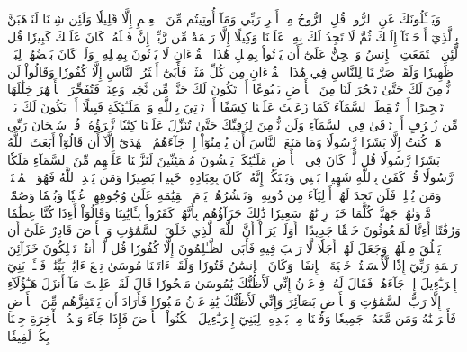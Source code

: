 وَيَسۡـَٔلُونَكَ عَنِ ٱلرُّوحِۖ قُلِ ٱلرُّوحُ مِنۡ أَمۡرِ رَبِّي وَمَآ أُوتِيتُم مِّنَ ٱلۡعِلۡمِ إِلَّا قَلِيلٗا
وَلَئِن شِئۡنَا لَنَذۡهَبَنَّ بِٱلَّذِيٓ أَوۡحَيۡنَآ إِلَيۡكَ ثُمَّ لَا تَجِدُ لَكَ بِهِۦ عَلَيۡنَا وَكِيلًا
إِلَّا رَحۡمَةٗ مِّن رَّبِّكَۚ إِنَّ فَضۡلَهُۥ كَانَ عَلَيۡكَ كَبِيرٗا
قُل لَّئِنِ ٱجۡتَمَعَتِ ٱلۡإِنسُ وَٱلۡجِنُّ عَلَىٰٓ أَن يَأۡتُواْ بِمِثۡلِ هَٰذَا ٱلۡقُرۡءَانِ لَا يَأۡتُونَ بِمِثۡلِهِۦ وَلَوۡ كَانَ بَعۡضُهُمۡ لِبَعۡضٖ ظَهِيرٗا
وَلَقَدۡ صَرَّفۡنَا لِلنَّاسِ فِي هَٰذَا ٱلۡقُرۡءَانِ مِن كُلِّ مَثَلٖ فَأَبَىٰٓ أَكۡثَرُ ٱلنَّاسِ إِلَّا كُفُورٗا
وَقَالُواْ لَن نُّؤۡمِنَ لَكَ حَتَّىٰ تَفۡجُرَ لَنَا مِنَ ٱلۡأَرۡضِ يَنۢبُوعًا
أَوۡ تَكُونَ لَكَ جَنَّةٞ مِّن نَّخِيلٖ وَعِنَبٖ فَتُفَجِّرَ ٱلۡأَنۡهَٰرَ خِلَٰلَهَا تَفۡجِيرًا
أَوۡ تُسۡقِطَ ٱلسَّمَآءَ كَمَا زَعَمۡتَ عَلَيۡنَا كِسَفًا أَوۡ تَأۡتِيَ بِٱللَّهِ وَٱلۡمَلَـٰٓئِكَةِ قَبِيلًا
أَوۡ يَكُونَ لَكَ بَيۡتٞ مِّن زُخۡرُفٍ أَوۡ تَرۡقَىٰ فِي ٱلسَّمَآءِ وَلَن نُّؤۡمِنَ لِرُقِيِّكَ حَتَّىٰ تُنَزِّلَ عَلَيۡنَا كِتَٰبٗا نَّقۡرَؤُهُۥۗ قُلۡ سُبۡحَانَ رَبِّي هَلۡ كُنتُ إِلَّا بَشَرٗا رَّسُولٗا
وَمَا مَنَعَ ٱلنَّاسَ أَن يُؤۡمِنُوٓاْ إِذۡ جَآءَهُمُ ٱلۡهُدَىٰٓ إِلَّآ أَن قَالُوٓاْ أَبَعَثَ ٱللَّهُ بَشَرٗا رَّسُولٗا
قُل لَّوۡ كَانَ فِي ٱلۡأَرۡضِ مَلَـٰٓئِكَةٞ يَمۡشُونَ مُطۡمَئِنِّينَ لَنَزَّلۡنَا عَلَيۡهِم مِّنَ ٱلسَّمَآءِ مَلَكٗا رَّسُولٗا
قُلۡ كَفَىٰ بِٱللَّهِ شَهِيدَۢا بَيۡنِي وَبَيۡنَكُمۡۚ إِنَّهُۥ كَانَ بِعِبَادِهِۦ خَبِيرَۢا بَصِيرٗا
وَمَن يَهۡدِ ٱللَّهُ فَهُوَ ٱلۡمُهۡتَدِۖ وَمَن يُضۡلِلۡ فَلَن تَجِدَ لَهُمۡ أَوۡلِيَآءَ مِن دُونِهِۦۖ وَنَحۡشُرُهُمۡ يَوۡمَ ٱلۡقِيَٰمَةِ عَلَىٰ وُجُوهِهِمۡ عُمۡيٗا وَبُكۡمٗا وَصُمّٗاۖ مَّأۡوَىٰهُمۡ جَهَنَّمُۖ كُلَّمَا خَبَتۡ زِدۡنَٰهُمۡ سَعِيرٗا
ذَٰلِكَ جَزَآؤُهُم بِأَنَّهُمۡ كَفَرُواْ بِـَٔايَٰتِنَا وَقَالُوٓاْ أَءِذَا كُنَّا عِظَٰمٗا وَرُفَٰتًا أَءِنَّا لَمَبۡعُوثُونَ خَلۡقٗا جَدِيدًا
۞أَوَلَمۡ يَرَوۡاْ أَنَّ ٱللَّهَ ٱلَّذِي خَلَقَ ٱلسَّمَٰوَٰتِ وَٱلۡأَرۡضَ قَادِرٌ عَلَىٰٓ أَن يَخۡلُقَ مِثۡلَهُمۡ وَجَعَلَ لَهُمۡ أَجَلٗا لَّا رَيۡبَ فِيهِ فَأَبَى ٱلظَّـٰلِمُونَ إِلَّا كُفُورٗا
قُل لَّوۡ أَنتُمۡ تَمۡلِكُونَ خَزَآئِنَ رَحۡمَةِ رَبِّيٓ إِذٗا لَّأَمۡسَكۡتُمۡ خَشۡيَةَ ٱلۡإِنفَاقِۚ وَكَانَ ٱلۡإِنسَٰنُ قَتُورٗا
وَلَقَدۡ ءَاتَيۡنَا مُوسَىٰ تِسۡعَ ءَايَٰتِۭ بَيِّنَٰتٖۖ فَسۡـَٔلۡ بَنِيٓ إِسۡرَـٰٓءِيلَ إِذۡ جَآءَهُمۡ فَقَالَ لَهُۥ فِرۡعَوۡنُ إِنِّي لَأَظُنُّكَ يَٰمُوسَىٰ مَسۡحُورٗا
قَالَ لَقَدۡ عَلِمۡتَ مَآ أَنزَلَ هَـٰٓؤُلَآءِ إِلَّا رَبُّ ٱلسَّمَٰوَٰتِ وَٱلۡأَرۡضِ بَصَآئِرَ وَإِنِّي لَأَظُنُّكَ يَٰفِرۡعَوۡنُ مَثۡبُورٗا
فَأَرَادَ أَن يَسۡتَفِزَّهُم مِّنَ ٱلۡأَرۡضِ فَأَغۡرَقۡنَٰهُ وَمَن مَّعَهُۥ جَمِيعٗا
وَقُلۡنَا مِنۢ بَعۡدِهِۦ لِبَنِيٓ إِسۡرَـٰٓءِيلَ ٱسۡكُنُواْ ٱلۡأَرۡضَ فَإِذَا جَآءَ وَعۡدُ ٱلۡأٓخِرَةِ جِئۡنَا بِكُمۡ لَفِيفٗا
